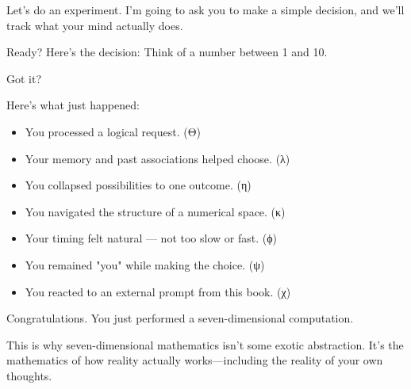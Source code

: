 Let's do an experiment. I'm going to ask you to make a simple decision, and we'll track what your mind actually does.

Ready? Here's the decision: Think of a number between 1 and 10.

Got it?

Here's what just happened:
\begin{itemize}
\item You processed a logical request. (Θ)
\item Your memory and past associations helped choose. (λ)
\item You collapsed possibilities to one outcome. (η)
\item You navigated the structure of a numerical space. (κ)
\item Your timing felt natural — not too slow or fast. (ϕ)
\item You remained "you" while making the choice. (ψ)
\item You reacted to an external prompt from this book. (χ)
\end{itemize}

Congratulations. You just performed a seven-dimensional computation.

This is why seven-dimensional mathematics isn't some exotic abstraction. It's the mathematics of how reality actually works—including the reality of your own thoughts.
